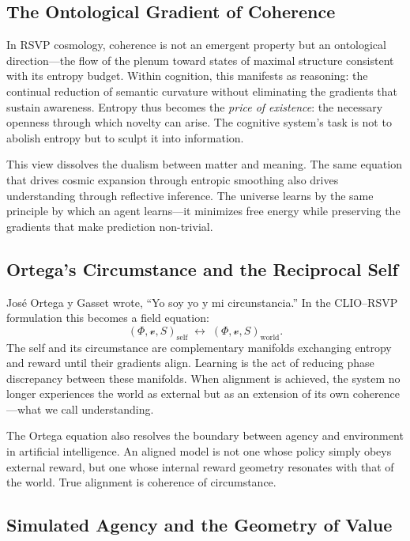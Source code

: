 \documentclass[11pt]{article}
\begin{document}
\subsection{The Ontological Gradient of Coherence}

In RSVP cosmology, coherence is not an emergent property but an ontological direction—the flow of the plenum toward states of maximal structure consistent with its entropy budget.  
Within cognition, this manifests as reasoning: the continual reduction of semantic curvature without eliminating the gradients that sustain awareness.  
Entropy thus becomes the \emph{price of existence}: the necessary openness through which novelty can arise.  
The cognitive system’s task is not to abolish entropy but to sculpt it into information.

This view dissolves the dualism between matter and meaning.  
The same equation that drives cosmic expansion through entropic smoothing also drives understanding through reflective inference.  
The universe learns by the same principle by which an agent learns—it minimizes free energy while preserving the gradients that make prediction non-trivial.

\subsection{Ortega’s Circumstance and the Reciprocal Self}

José Ortega y Gasset wrote, “Yo soy yo y mi circunstancia.”  
In the CLIO–RSVP formulation this becomes a field equation:
\[
(\Phi,\mathcal{v},S)_\text{self}
\;\leftrightarrow\;
(\Phi,\mathcal{v},S)_\text{world}.
\]
The self and its circumstance are complementary manifolds exchanging entropy and reward until their gradients align.  
Learning is the act of reducing phase discrepancy between these manifolds.  
When alignment is achieved, the system no longer experiences the world as external but as an extension of its own coherence—what we call understanding.

The Ortega equation also resolves the boundary between agency and environment in artificial intelligence.  
An aligned model is not one whose policy simply obeys external reward, but one whose internal reward geometry resonates with that of the world.  
True alignment is coherence of circumstance.

\subsection{Simulated Agency and the Geometry of Value}
\end{document}
